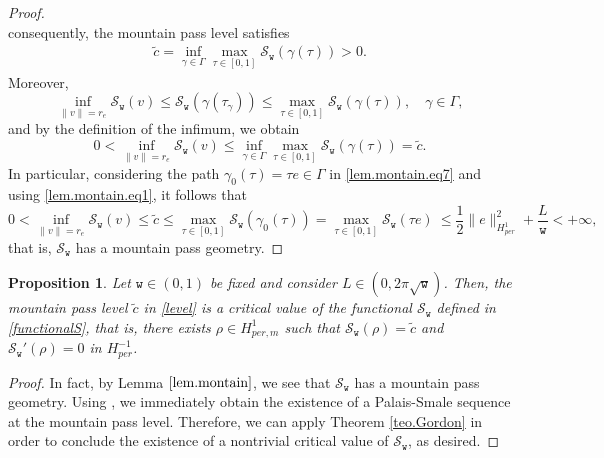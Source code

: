 \documentclass[12pt,reqno,a4paper]{amsart} %
\newtheorem{prop}{Proposition}[section]
\numberwithin{equation}{section}
\numberwithin{figure}{section}
\begin{document}
\begin{proof}
\begin{equation}
 	\end{equation}consequently, the mountain pass level satisfies
 	\begin{align}\label{level}
 		\tilde{c}=\inf_{\gamma\in\Gamma}\max_{\tau\in[0,1]} \mathcal{S}_\mathtt{w}(\gamma(\tau))>0.
 	\end{align}
 	Moreover,
 	\begin{equation}\label{lem.montain.eq6} \inf_{\|v\|=r_e}\mathcal{S}_\mathtt{w}(v)\leq\mathcal{S}_\mathtt{w}(\gamma(\tau_\gamma))\leq \max_{\tau\in[0,1]} \mathcal{S}_\mathtt{w}(\gamma(\tau)), \quad\gamma\in \Gamma,\nonumber
 	\end{equation}and by the definition of the infimum, we obtain
 	\begin{equation}\label{lem.montain.eq7} 0<\inf_{\|v\|=r_e}\mathcal{S}_\mathtt{w}(v) \leq \inf_{\gamma\in\Gamma}\max_{\tau\in[0,1]} \mathcal{S}_\mathtt{w}(\gamma(\tau)) =\tilde{c}.
 	\end{equation}In particular, considering the path $\gamma_0(\tau)=\tau e \in \Gamma$ 		  
 	in \eqref{lem.montain.eq7} and using \eqref{lem.montain.eq1}, it follows that
 	\begin{equation}\label{lem.montain.eq8} 0<\inf_{\|v\|=r_e}\mathcal{S}_\mathtt{w}(v) \leq\tilde{c}\leq     \max_{\tau\in[0,1]}\mathcal{S}_\mathtt{w}(\gamma_0(\tau)) =\max_{\tau\in[0,1]}\mathcal{S}_\mathtt{w}(\tau e)\ \leq \frac{1}{2}\|e\|^2_{H^1_{per}}+\frac{L}{\mathtt{w}}<+\infty,
 	\end{equation}
 	 that is, $\mathcal{S}_\mathtt{w}$ has a mountain pass geometry. \end{proof}
 
 \begin{prop}\label{prop.Gordon} Let $\mathtt{w}\in(0,1)$ be fixed and  consider  $L\in(0,2\pi \sqrt{\mathtt{w}})$. Then, the mountain pass level $\tilde{c}$ in \eqref{level} is a critical value of the functional $\mathcal{S}_\mathtt{w}$ defined in \eqref{functionalS}, that is, there exists $\rho\in H^1_{per,m}$ such that $\mathcal{S}_\mathtt{w}(\rho)=\tilde{c}$ and $\mathcal{S}_\mathtt{w}'(\rho)=0$ in $H^{-1}_{per}$. 	 
 \end{prop}
 \begin{proof}
 	In fact, by Lemma $\ref{lem.montain}$, we see that $\mathcal{S}_\mathtt{w}$ has a mountain pass geometry. Using \cite[Theorem 2.9]{willem}, we immediately obtain the existence of a Palais-Smale sequence at the mountain pass level. Therefore, we can apply Theorem \ref{teo.Gordon} in order to conclude the existence of a nontrivial critical value of $\mathcal{S}_\mathtt{w}$, as desired.
 \end{proof}
 
\end{document}
